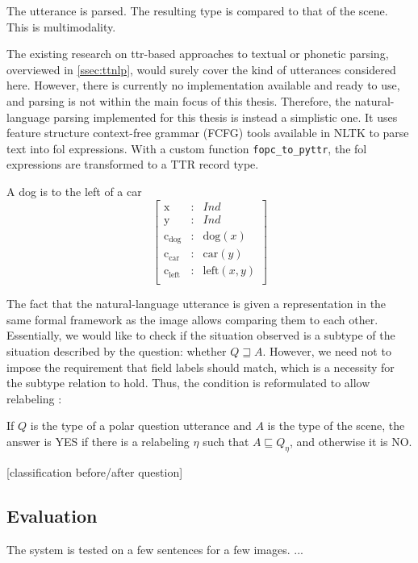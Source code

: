 The utterance is parsed.
The resulting type is compared to that of the scene.
This is multimodality.

The existing research on \gls{ttr}-based approaches to textual or phonetic parsing, overviewed in \autoref{ssec:ttnlp}, would surely cover the kind of utterances considered here.
However, there is currently no implementation available and ready to use, and parsing is not within the main focus of this thesis.
Therefore, the natural-language parsing implemented for this thesis is instead a simplistic one.
It uses feature structure context-free grammar (FCFG) tools available in NLTK \cite{BirdNaturalLanguageProcessing2009} to parse text into \gls{fol} expressions.
With a custom function {\tt fopc\_to\_pyttr}, the \gls{fol} expressions are transformed to a TTR record type.

A dog is to the left of a car
\begin{equation}\left[\begin{array}{rcl}
\text{x} &:& Ind\\
\text{y} &:& Ind\\
\text{c}_\text{dog} &:& \text{dog}(x)\\
\text{c}_\text{car} &:& \text{car}(y)\\
\text{c}_\text{left} &:& \text{left}(x, y)\\
\end{array}\right]\end{equation}

The fact that the natural-language utterance is given a representation in the same formal framework as the image allows comparing them to each other.
Essentially, we would like to check if the situation observed is a subtype of the situation described by the question: whether $Q \sqsupseteq A$.
However, we need not to impose the requirement that field labels should match, which is a necessity for the subtype relation to hold.
Thus, the condition is reformulated to allow relabeling \citep[pp. 133–135]{CooperTypetheorylanguage2016}:

If $Q$ is the type of a polar question utterance and $A$ is the type of the scene, the answer is YES if there is a relabeling $\eta$ such that $A \sqsubseteq Q_\eta$, and otherwise it is NO.

[classification before/after question]



\subsection{Evaluation}

The system is tested on a few sentences for a few images.
...
